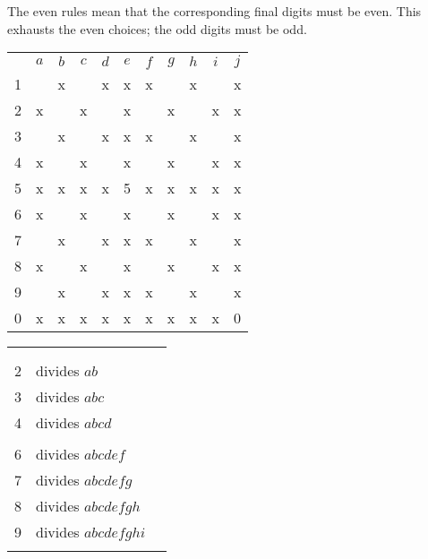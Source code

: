 The even rules mean that the corresponding final digits must be even.  This exhausts the even choices; the odd digits must be odd.
\begin{center}
\begin{tabular}{ccccccccccc}
			&	$a$	&	$b$	&	$c$	&	$d$	&	$e$	&	$f$	&	$g$	&	$h$	&	$i$	&	$j$	\\
	1		&		&	x	&		&	x	&	x	&	x	&		&	x	&		&	x	\\
	2		&	x	&		&	x	&		&	x	&		&	x	&		&	x	&	x	\\
	3		&		&	x	&		&	x	&	x	&	x	&		&	x	&		&	x	\\
	4		&	x	&		&	x	&		&	x	&		&	x	&		&	x	&	x	\\
	5		&	x	&	x	&	x	&	x	&	5	&	x	&	x	&	x	&	x	&	x	\\
	6		&	x	&		&	x	&		&	x	&		&	x	&		&	x	&	x	\\
	7		&		&	x	&		&	x	&	x	&	x	&		&	x	&		&	x	\\
	8		&	x	&		&	x	&		&	x	&		&	x	&		&	x	&	x	\\
	9		&		&	x	&		&	x	&	x	&	x	&		&	x	&		&	x	\\
	0		&	x	&	x	&	x	&	x	&	x	&	x	&	x	&	x	&	x	&	0	\\
\end{tabular}
\hspace{1cm}\vline\hspace{1cm}
\begin{tabular}{rll}
	& 		\\
	& 		\\
	2	&	divides $ab$					\\
	3	&	divides $abc$					\\
	4	&	divides $abcd$					\\
		&	\\
	6	&	divides $abcdef$				\\
	7	&	divides $abcdefg$				\\
	8	&	divides $abcdefgh$				\\
	9	&	divides $abcdefghi$				\\
		&	
\end{tabular}
\end{center}

